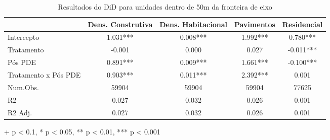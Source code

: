 \begin{table}[!t]
\caption{Resultados do DiD para unidades dentro de 50m da fronteira de eixo} 
\fontsize{10.0pt}{12pt}\selectfont
\centering
\begin{tabular*}{.9\linewidth}{@{\extracolsep{\fill}}lcccc}
\toprule
  & Dens. Construtiva & Dens. Habitacional & Pavimentos & Residencial \\ 
\midrule\addlinespace[2.5pt]
Intercepto & 1.031*** & 0.008*** & 1.992*** & 0.780*** \\ 
Tratamento & -0.001 & 0.000 & 0.027 & -0.011*** \\ 
Pós PDE & 0.891*** & 0.009*** & 1.661*** & -0.100*** \\ 
{Tratamento x Pós PDE} & {0.903***} & {0.011***} & {2.392***} & {0.001} \\ 
\midrule
Num.Obs. & 59904 & 59904 & 59904 & 77625 \\ 
R2 & 0.027 & 0.032 & 0.026 & 0.001 \\ 
R2 Adj. & 0.027 & 0.032 & 0.026 & 0.001 \\ 
\bottomrule
\end{tabular*}
\label{tab:did-IPTU}
\begin{minipage}{.9\linewidth}
+ p < 0.1, * p < 0.05, ** p < 0.01, *** p < 0.001\\
\end{minipage}
\end{table}

